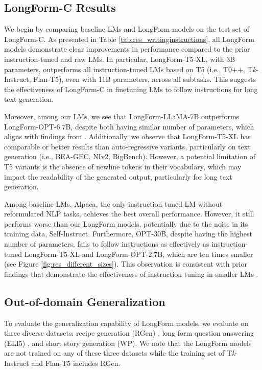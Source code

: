	\subsection{LongForm-C Results} We begin by comparing baseline LMs and LongForm models on the test set of LongForm-C. As presented in Table \ref{tab:res_writinginstructions},
	all LongForm models demonstrate clear improvements in performance compared to the prior instruction-tuned and raw LMs. In particular, LongForm-T5-XL, with 3B parameters, outperforms all instruction-tuned LMs based on T5 (i.e., T0++, T\textit{k}-Instruct, Flan-T5), even with 11B parameters, across all subtasks. This suggests the effectiveness of LongForm-C in finetuning LMs to follow instructions for long text generation.

	Moreover, among our LMs, we see that LongForm-LLaMA-7B outperforms LongForm-OPT-6.7B, despite both having similar number of parameters, which aligns with findings from \citet{touvron2023llama}. Additionally, we observe that LongForm-T5-XL has comparable or better results than auto-regressive variants, particularly on text generation  (i.e., BEA-GEC, NIv2, BigBench). However, a potential limitation of T5 variants is the absence of newline tokens in their vocabulary, which may impact the readability of the generated output, particularly for long text generation.

	Among baseline LMs, Alpaca, the only instruction tuned LM without reformulated NLP tasks, achieves the best overall performance. However, it still performs worse than our LongForm models, potentially due to the noise in its training data, Self-Instruct. Furthermore, OPT-30B, despite having the highest number of parameters, fails to follow instructions as effectively as instruction-tuned LongForm-T5-XL and LongForm-OPT-2.7B, which are ten times smaller (see Figure \ref{fig:res_different_sizes}).
	This observation is consistent with prior findings that demonstrate the effectiveness of instruction tuning in smaller LMs \cite{ouyang2022training}.

	\subsection{Out-of-domain Generalization}

To evaluate the generalization capability of LongForm models, we evaluate on three diverse datasets: recipe generation (RGen) \cite{bien-etal-2020-recipenlg}, long form question answering (ELI5) \cite{fan-etal-2019-eli5}, and short story generation (WP). We note  that the LongForm models are not trained on any of these three datasets while the training set of T\textit{k}-Instruct and Flan-T5 includes RGen.

